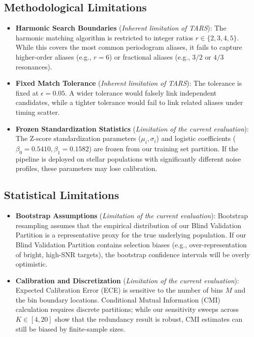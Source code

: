 \subsection{Methodological Limitations} \label{sec:limit_method}
\begin{itemize}
\item \textbf{Harmonic Search Boundaries} (\textit{Inherent limitation of TARS}): The harmonic matching algorithm is restricted to integer ratios $r \in \{2, 3, 4, 5\}$. While this covers the most common periodogram aliases, it fails to capture higher-order aliases (e.g., $r = 6$) or fractional aliases (e.g., $3/2$ or $4/3$ resonances).
\item \textbf{Fixed Match Tolerance} (\textit{Inherent limitation of TARS}): The tolerance is fixed at $\epsilon = 0.05$. A wider tolerance would falsely link independent candidates, while a tighter tolerance would fail to link related aliases under timing scatter.
\item \textbf{Frozen Standardization Statistics} (\textit{Limitation of the current evaluation}): The Z-score standardization parameters ($\mu_i, \sigma_i$) and logistic coefficients ($\beta_0 = 0.5410, \beta_1 = 0.1582$) are frozen from our training set partition. If the pipeline is deployed on stellar populations with significantly different noise profiles, these parameters may lose calibration.
\end{itemize}

\subsection{Statistical Limitations} \label{sec:limit_statistical}
\begin{itemize}
\item \textbf{Bootstrap Assumptions} (\textit{Limitation of the current evaluation}): Bootstrap resampling assumes that the empirical distribution of our Blind Validation Partition is a representative proxy for the true underlying population. If our Blind Validation Partition contains selection biases (e.g., over-representation of bright, high-SNR targets), the bootstrap confidence intervals will be overly optimistic.
\item \textbf{Calibration and Discretization} (\textit{Limitation of the current evaluation}): Expected Calibration Error (ECE) is sensitive to the number of bins $M$ and the bin boundary locations. Conditional Mutual Information (CMI) calculation requires discrete partitions; while our sensitivity sweeps across $K \in [4, 20]$ show that the redundancy result is robust, CMI estimates can still be biased by finite-sample sizes.
\end{itemize}

